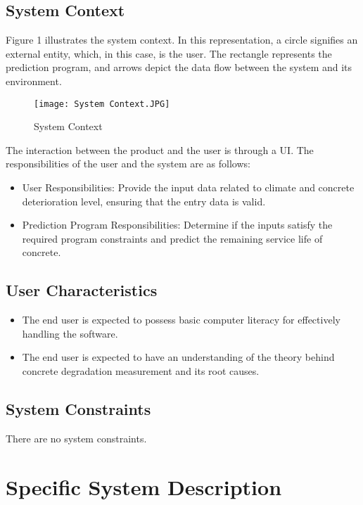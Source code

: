 \documentclass[12pt]{article}
\begin{document}
\subsection{System Context}
Figure 1 illustrates the system context. In this representation, a circle signifies an external entity, which, in this case, is the user. The rectangle represents the prediction program, and arrows depict the data flow between the system and its environment.

\begin{figure}
    \centering
    \texttt{[image: System Context.JPG]}
    \caption{System Context}
    \label{fig:enter-label}
\end{figure}

The interaction between the product and the user is through a UI. The responsibilities of the user and the system are as follows: 

\begin{itemize}
\item User Responsibilities: Provide the input data related to climate and concrete deterioration level, ensuring that the entry data is valid.
\end{itemize}
\begin{itemize}
\item Prediction Program Responsibilities: Determine if the inputs satisfy the required program constraints and predict the remaining service life of concrete.
\end{itemize}

\subsection{User Characteristics} \label{SecUserCharacteristics}
\begin{itemize}
\item The end user is expected to possess basic computer literacy for effectively handling the software.
\item The end user is expected to have an understanding of the theory behind concrete degradation measurement and its root causes.
\end{itemize}

\subsection{System Constraints}

There are no system constraints.

\section{Specific System Description}
\end{document}
